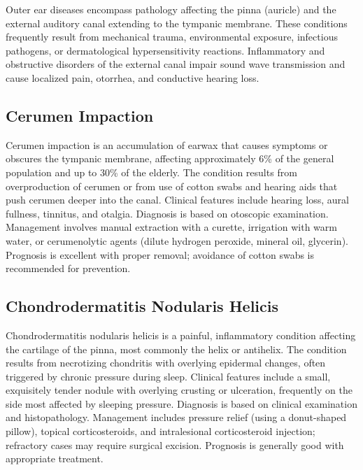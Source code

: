 

Outer ear diseases encompass pathology affecting the pinna (auricle) and the external auditory canal extending to the tympanic membrane. These conditions frequently result from mechanical trauma, environmental exposure, infectious pathogens, or dermatological hypersensitivity reactions. Inflammatory and obstructive disorders of the external canal impair sound wave transmission and cause localized pain, otorrhea, and conductive hearing loss.





\label{sec:Outer Ear Diseases}

\subsection{Cerumen Impaction}
\label{sec:Cerumen Impaction}
Cerumen impaction is an accumulation of earwax that causes symptoms or obscures the tympanic membrane, affecting approximately 6\% of the general population and up to 30\% of the elderly. The condition results from overproduction of cerumen or from use of cotton swabs and hearing aids that push cerumen deeper into the canal. Clinical features include hearing loss, aural fullness, tinnitus, and otalgia. Diagnosis is based on otoscopic examination. Management involves manual extraction with a curette, irrigation with warm water, or cerumenolytic agents (dilute hydrogen peroxide, mineral oil, glycerin). Prognosis is excellent with proper removal; avoidance of cotton swabs is recommended for prevention.

\subsection{Chondrodermatitis Nodularis Helicis}
\label{sec:Chondrodermatitis Nodularis Helicis}
Chondrodermatitis nodularis helicis is a painful, inflammatory condition affecting the cartilage of the pinna, most commonly the helix or antihelix. The condition results from necrotizing chondritis with overlying epidermal changes, often triggered by chronic pressure during sleep. Clinical features include a small, exquisitely tender nodule with overlying crusting or ulceration, frequently on the side most affected by sleeping pressure. Diagnosis is based on clinical examination and histopathology. Management includes pressure relief (using a donut-shaped pillow), topical corticosteroids, and intralesional corticosteroid injection; refractory cases may require surgical excision. Prognosis is generally good with appropriate treatment.

